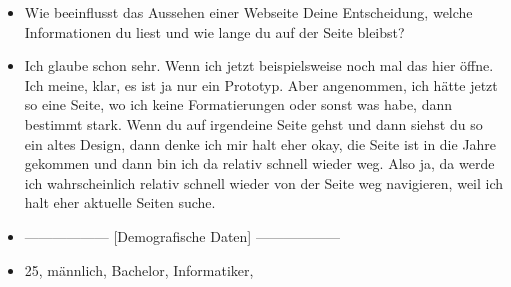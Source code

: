 {\begin{itemize}[]
    \item {} Wie beeinflusst das Aussehen einer Webseite Deine Entscheidung, welche Informationen du liest und wie lange du auf der Seite bleibst?
    \item {} Ich glaube schon sehr. 
    Wenn ich jetzt beispielsweise noch mal das hier öffne.
    Ich meine, klar, es ist ja nur ein Prototyp. 
    Aber angenommen, ich hätte jetzt so eine Seite, wo ich keine Formatierungen oder sonst was habe, dann bestimmt stark.
    Wenn du auf irgendeine Seite gehst und dann siehst du so ein altes Design, dann denke ich mir halt eher okay, die Seite ist in die Jahre gekommen und dann bin ich da relativ schnell wieder weg.
    Also ja, da werde ich wahrscheinlich relativ schnell wieder von der Seite weg navigieren, weil ich halt eher aktuelle Seiten suche.
    \item {------------------} [Demografische Daten] {------------------}
    \item {} 25, männlich, Bachelor, Informatiker, 
\end{itemize}}
\nolinenumbers
